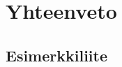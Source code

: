\documentclass[finnish, authoryear]{config/tauthesis}
\theoremstyle{definition}
\begin{document}
\chapter{Yhteenveto}
\label{ch:yhteenveto}



\printbibliography[heading=bibintoc]



\begin{appendices}

\chapter{Esimerkkiliite}
\label{ch:liite}


\end{appendices}
\end{document}
